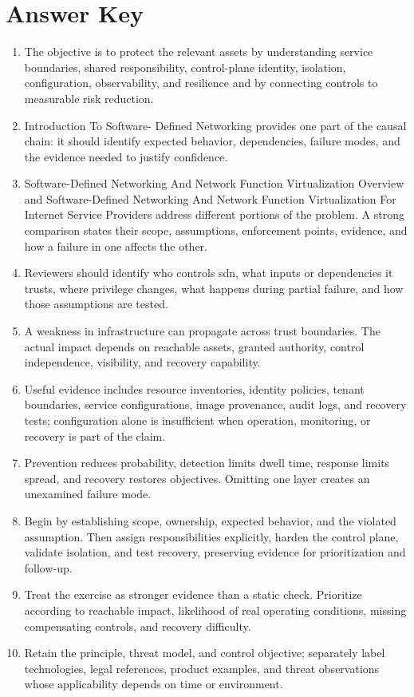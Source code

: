 \documentclass[11pt]{article}
\begin{document}
\section*{Answer Key}
\begin{enumerate}
\item The objective is to protect the relevant assets by understanding service boundaries, shared responsibility, control-plane identity, isolation, configuration, observability, and resilience and by connecting controls to measurable risk reduction.
\item Introduction To Software- Defined Networking provides one part of the causal chain: it should identify expected behavior, dependencies, failure modes, and the evidence needed to justify confidence.
\item Software-Defined Networking And Network Function Virtualization Overview and Software-Defined Networking And Network Function Virtualization For Internet Service Providers address different portions of the problem. A strong comparison states their scope, assumptions, enforcement points, evidence, and how a failure in one affects the other.
\item Reviewers should identify who controls sdn, what inputs or dependencies it trusts, where privilege changes, what happens during partial failure, and how those assumptions are tested.
\item A weakness in infrastructure can propagate across trust boundaries. The actual impact depends on reachable assets, granted authority, control independence, visibility, and recovery capability.
\item Useful evidence includes resource inventories, identity policies, tenant boundaries, service configurations, image provenance, audit logs, and recovery tests; configuration alone is insufficient when operation, monitoring, or recovery is part of the claim.
\item Prevention reduces probability, detection limits dwell time, response limits spread, and recovery restores objectives. Omitting one layer creates an unexamined failure mode.
\item Begin by establishing scope, ownership, expected behavior, and the violated assumption. Then assign responsibilities explicitly, harden the control plane, validate isolation, and test recovery, preserving evidence for prioritization and follow-up.
\item Treat the exercise as stronger evidence than a static check. Prioritize according to reachable impact, likelihood of real operating conditions, missing compensating controls, and recovery difficulty.
\item Retain the principle, threat model, and control objective; separately label technologies, legal references, product examples, and threat observations whose applicability depends on time or environment.
\end{enumerate}
\end{document}
